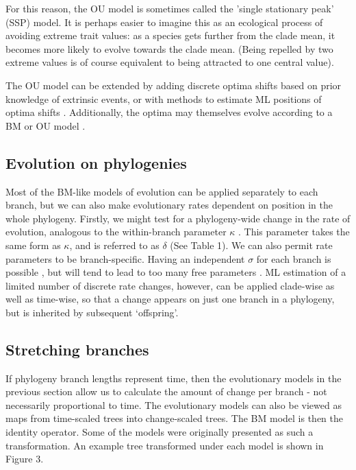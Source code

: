 \documentclass[12pt]{article}
\begin{document}
For this reason, the OU model is sometimes called the 'single stationary peak' (SSP) model.
It is perhaps easier to imagine this as an ecological process of avoiding extreme trait values: as a species gets further from the clade mean, it becomes more likely to evolve towards the clade mean. 
(Being repelled by two extreme values is of course equivalent to being attracted to one central value).

The OU model can be extended by adding discrete optima shifts based on prior knowledge of extrinsic events, or with  methods to estimate ML positions of optima shifts \citep{hansen_stabilizing_1997,hansen_assessing_2005}. Additionally, the optima may themselves evolve according to a BM or OU model \cite{hansen_measuring_2008,hansen_interpreting_2012}. 

\subsection{Evolution on phylogenies}

Most of the BM-like models of evolution can be applied separately to each branch, but we can also make evolutionary rates dependent on position in the whole phylogeny. Firstly, we might test for a phylogeny-wide change in the rate of evolution, analogous to the within-branch parameter $\kappa$ \citep{pagel_inferring_1997}. This parameter takes the same form as $\kappa$, and is referred to as $\delta$ \citep{thomas_motmot:_2012} (See Table 1). We can also permit rate parameters to be branch-specific. 
Having an independent $\sigma$ for each branch is possible \citep{mooers_using_1999}, but will tend to lead to too many free parameters \citep{thomas_motmot:_2012}. ML estimation of a limited number of discrete rate changes, however, can be applied clade-wise as well as time-wise, so that a change appears on just one branch in a phylogeny, but is inherited by subsequent `offspring'.

\subsection{Stretching branches}

If phylogeny branch lengths represent time, then the evolutionary models in the previous section allow us to calculate the amount of change per branch - not necessarily proportional to time. The evolutionary models can also be viewed as maps from time-scaled trees into change-scaled trees. The BM model is then the identity operator. Some of the models were originally presented as such a transformation. An example tree transformed under each model is shown in Figure 3.
\end{document}
